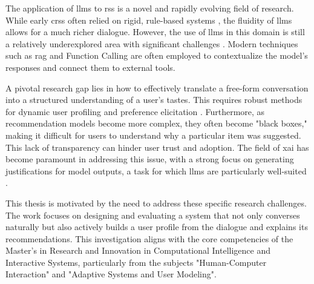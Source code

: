 The application of \acp{llm} to \acp{rs} is a novel and rapidly evolving field of research. While early \acp{crs} often relied on rigid, rule-based systems \cite{SOTA-CRS}, the fluidity of \acp{llm} allows for a much richer dialogue. However, the use of \acp{llm} in this domain is still a relatively underexplored area with significant challenges \cite{SOTA-CRS-LLM, BOOK:RS-HANDBOOK}. Modern techniques such as \ac{rag} \cite{SOTA-RAG-SURVEY} and Function Calling are often employed to contextualize the model's responses and connect them to external tools.

A pivotal research gap lies in how to effectively translate a free-form conversation into a structured understanding of a user's tastes. This requires robust methods for dynamic user profiling and preference elicitation \cite[Conversational Preference Elicitation]{CHAPTER:RS-HANDBOOK-NLP}. Furthermore, as recommendation models become more complex, they often become "black boxes," making it difficult for users to understand why a particular item was suggested. This lack of transparency can hinder user trust and adoption. The field of \ac{xai} has become paramount in addressing this issue, with a strong focus on generating justifications for model outputs, a task for which \acp{llm} are particularly well-suited \cite[Generating Textual Explanations]{CHAPTER:RS-HANDBOOK-NLP, SOTA-RECSYS-EXPLAIN}.

This thesis is motivated by the need to address these specific research challenges. The work focuses on designing and evaluating a system that not only converses naturally but also actively builds a user profile from the dialogue and explains its recommendations. This investigation aligns with the core competencies of the Master's in Research and Innovation in Computational Intelligence and Interactive Systems, particularly from the subjects "Human-Computer Interaction" and "Adaptive Systems and User Modeling".